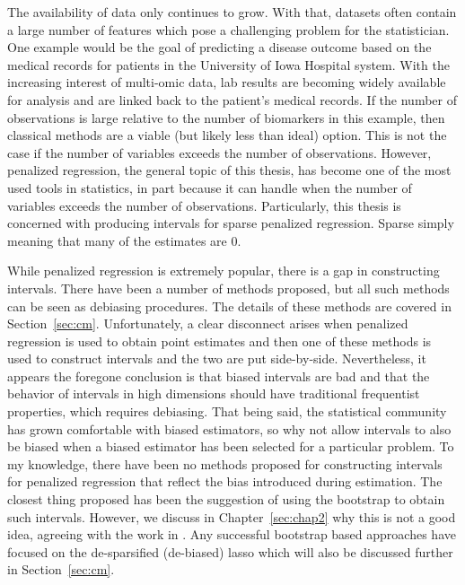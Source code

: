 \label{intro}

The availability of data only continues to grow. With that, datasets often contain a large number of features which pose a challenging problem for the statistician. One example would be the goal of predicting a disease outcome based on the medical records for patients in the University of Iowa Hospital system. With the increasing interest of multi-omic data, lab results are becoming widely available for analysis and are linked back to the patient's medical records. If the number of observations is large relative to the number of biomarkers in this example, then classical methods are a viable (but likely less than ideal) option. This is not the case if the number of variables exceeds the number of observations. However, penalized regression, the general topic of this thesis, has become one of the most used tools in statistics, in part because it can handle when the number of variables exceeds the number of observations. Particularly, this thesis is concerned with producing intervals for sparse penalized regression. Sparse simply meaning that many of the estimates are 0. 

While penalized regression is extremely popular, there is a gap in constructing intervals. There have been a number of methods proposed, but all such methods can be seen as debiasing procedures. The details of these methods are covered in Section~\ref{sec:cm}. Unfortunately, a clear disconnect arises when penalized regression is used to obtain point estimates and then one of these methods is used to construct intervals and the two are put side-by-side. Nevertheless, it appears the foregone conclusion is that biased intervals are bad and that the behavior of intervals in high dimensions should have traditional frequentist properties, which requires debiasing. That being said, the statistical community has grown comfortable with biased estimators, so why not allow intervals to also be biased when a biased estimator has been selected for a particular problem. To my knowledge, there have been no methods proposed for constructing intervals for penalized regression that reflect the bias introduced during estimation. The closest thing proposed has been the suggestion of using the bootstrap to obtain such intervals. However, we discuss in Chapter~\ref{sec:chap2} why this is not a good idea, agreeing with the work in \cite{Chatterjee2010}. Any successful bootstrap based approaches have focused on the de-sparsified (de-biased) lasso which will also be discussed further in Section~\ref{sec:cm}. 

